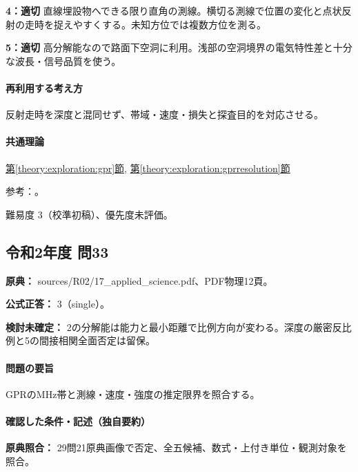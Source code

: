 \noindent\textbf{4：適切} 直線埋設物へできる限り直角の測線。横切る測線で位置の変化と点状反射の走時を捉えやすくする。未知方位では複数方位を測る。\par

\noindent\textbf{5：適切} 高分解能なので路面下空洞に利用。浅部の空洞境界の電気特性差と十分な波長・信号品質を使う。\par

\paragraph{再利用する考え方} 反射走時を深度と混同せず、帯域・速度・損失と探査目的を対応させる。

\paragraph{共通理論} \hyperref[theory:exploration:gpr]{第\ref*{theory:exploration:gpr}節}, \hyperref[theory:exploration:gprresolution]{第\ref*{theory:exploration:gprresolution}節}

\par 参考：\cite{epa_gpr}。

\par 難易度 3（校準初稿）、優先度未評価。

\subsection{令和2年度 問33}
\label{q:r02-reg-applied-33}

\noindent\textbf{原典：} sources/R02/17\_applied\_science.pdf、PDF物理12頁。

\textbf{公式正答：} 3（single）。

\par\textbf{検討未確定：} 2の分解能は能力と最小距離で比例方向が変わる。深度の厳密反比例と5の間接相関全面否定は留保。

\paragraph{問題の要旨} GPRのMHz帯と測線・速度・強度の推定限界を照合する。

\paragraph{確認した条件・記述（独自要約）}\mbox{}\par

\noindent\textbf{原典照合：} 29問21原典画像で否定、全五候補、数式・上付き単位・観測対象を照合。\par


